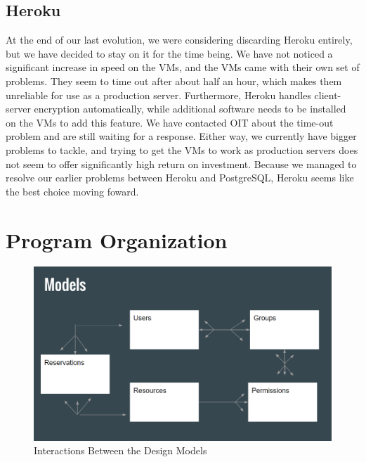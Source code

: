 \documentclass{article}
\begin{document}
\subsection{Heroku}
At the end of our last evolution, we were considering discarding Heroku entirely, but we have decided to stay on it for the time being.  We have not noticed a significant increase in speed on the VMs, and the VMs came with their own set of problems.  They seem to time out after about half an hour, which makes them unreliable for use as a production server.  Furthermore, Heroku handles client-server encryption automatically, while additional software needs to be installed on the VMs to add this feature.  We have contacted OIT about the time-out problem and are still waiting for a response.  Either way, we currently have bigger problems to tackle, and trying to get the VMs to work as production servers does not seem to offer significantly high return on investment.  Because we managed to resolve our earlier problems between Heroku and PostgreSQL, Heroku seems like the best choice moving foward.
\section{Program Organization}
\begin{figure}[h]
\centering
\includegraphics[width=5in]{snip}
\caption{Interactions Between the Design Models}
\end{figure}
\end{document}
